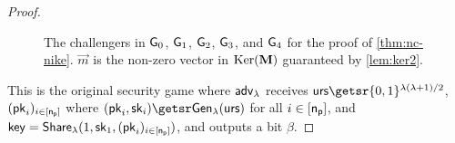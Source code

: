 \begin{proof}
\begin{figure}[h!]
\begin{center}
\end{center}
\caption{The challengers in $\mathsf{G}_0$, $\mathsf{G}_1$, $\mathsf{G}_2$, $\mathsf{G}_3$, and $\mathsf{G}_4$ for the proof of \cref{thm:nc-nike}. $\vec m$ is the non-zero vector in $\operatorname{Ker}(\mathbf{{M}})$ guaranteed by \cref{lem:ker2}.}
\label{fig:ncnike-hyb}
\end{figure}

 This is the original security game where ${\mathsf{adv}}_\lambda$ receives $\urs\getsr\bin^{\lambda(\lambda+1)/2}$, $(\mathsf{pk}_i)_{i\in[\mathsf{n_p}]}$ where $(\pk_i,\sk_i)\getsr\Gen(\urs)$ for all $i\in{[\mathsf{n_p}]}$, and $\mathsf{key}={\mathsf{Share}}_\lambda(1,\mathsf{sk}_1,\allowbreak(\mathsf{pk}_i)_{i\in{[\mathsf{n_p}]}})$, and outputs a bit $\beta$.


\end{proof}
